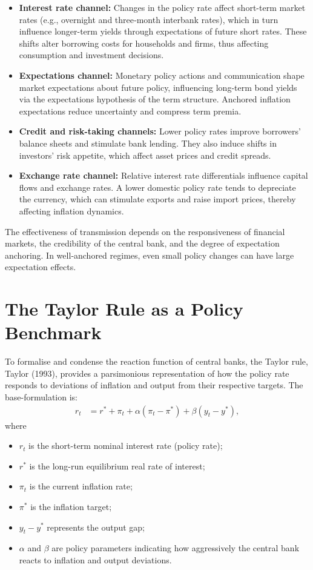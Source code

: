 \documentclass[
  letterpaper,
  DIV=11,
  numbers=noendperiod]{scrreprt}
\providecommand{\tightlist}{%
  \setlength{\itemsep}{0pt}\setlength{\parskip}{0pt}}
\begin{document}
\begin{itemize}
\item
  \textbf{Interest rate channel:} Changes in the policy rate affect
  short-term market rates (e.g., overnight and three‑month interbank
  rates), which in turn influence longer-term yields through
  expectations of future short rates. These shifts alter borrowing costs
  for households and firms, thus affecting consumption and investment
  decisions.
\item
  \textbf{Expectations channel:} Monetary policy actions and
  communication shape market expectations about future policy,
  influencing long-term bond yields via the expectations hypothesis of
  the term structure. Anchored inflation expectations reduce uncertainty
  and compress term premia.
\item
  \textbf{Credit and risk-taking channels:} Lower policy rates improve
  borrowers' balance sheets and stimulate bank lending. They also induce
  shifts in investors' risk appetite, which affect asset prices and
  credit spreads.
\item
  \textbf{Exchange rate channel:} Relative interest rate differentials
  influence capital flows and exchange rates. A lower domestic policy
  rate tends to depreciate the currency, which can stimulate exports and
  raise import prices, thereby affecting inflation dynamics.
\end{itemize}

The effectiveness of transmission depends on the responsiveness of
financial markets, the credibility of the central bank, and the degree
of expectation anchoring. In well‑anchored regimes, even small policy
changes can have large expectation effects.

\section{The Taylor Rule as a Policy
Benchmark}\label{the-taylor-rule-as-a-policy-benchmark}

To formalise and condense the reaction function of central banks, the
Taylor rule, Taylor (1993), provides a parsimonious representation of
how the policy rate responds to deviations of inflation and output from
their respective targets. The base-formulation is:
\begin{align}
    r_t &= r^* + \pi_t + \alpha (\pi_t - \pi^*) + \beta (y_t - y^*),
\end{align}
where

\begin{itemize}
\tightlist
\item
  \(r_t\) is the short-term nominal interest rate (policy rate);
\item
  \(r^*\) is the long-run equilibrium real rate of interest;
\item
  \(\pi_t\) is the current inflation rate;
\item
  \(\pi^*\) is the inflation target;
\item
  \(y_t - y^*\) represents the output gap;
\item
  \(\alpha\) and \(\beta\) are policy parameters indicating how
  aggressively the central bank reacts to inflation and output
  deviations.
\end{itemize}
\end{document}
